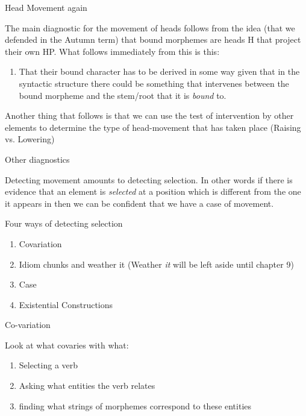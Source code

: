 \begin{frame}
  {Head Movement again}


The main diagnostic for the movement of heads follows from the idea (that we defended in the Autumn term) that bound morphemes are heads H that project their own HP.  What follows immediately from this is this:

\begin{enumerate}
  \item That their bound character has to be derived in some way given that in the syntactic structure there could be something that intervenes between the bound morpheme and the stem/root that it is \textit{bound} to.
\end{enumerate}

\end{frame}

\begin{frame}
  Another thing that follows is that we can use the test of intervention by other elements to determine the type of head-movement that has taken place (Raising vs. Lowering)
\end{frame}

\begin{frame}
  {Other diagnostics}

Detecting movement amounts to detecting selection.  In other words if there is evidence that an element is \textit{selected} at a position which is different from the one it appears in then we can be confident that we have a case of movement.

\end{frame}

\begin{frame}
  {Four ways of detecting selection}
  \begin{enumerate}
  \item Covariation
  \item Idiom chunks and weather it (Weather \textit{it} will be left aside until chapter 9)
  \item Case
  \item Existential Constructions
  \end{enumerate}
\end{frame}

\begin{frame}
  {Co-variation}

Look at what covaries with what:

\begin{enumerate}
\item Selecting a verb
\item Asking what entities the verb relates 
\item finding what strings of morphemes correspond to these entities
\end{enumerate}

\end{frame}

